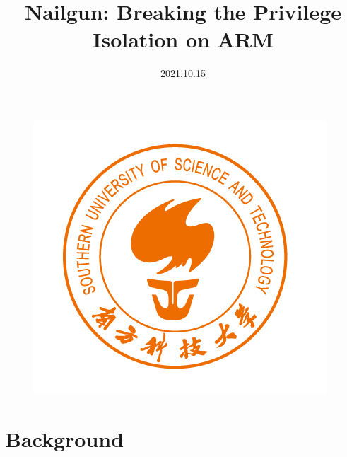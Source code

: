 \documentclass{beamer}
\title{Nailgun: Breaking the Privilege Isolation on ARM}
\date{2021.10.15}
\begin{document}
\kaishu
\begin{frame}
    \titlepage
    \begin{figure}[htbp]
        \begin{center}
            \includegraphics[scale = 0.16]{SUSTech-Beamer-Theme/pic/LOGO.png}
        \end{center}
    \end{figure}
\end{frame}

\begin{frame}
    \tableofcontents[sectionstyle=show,subsectionstyle=show/shaded/hide,subsubsectionstyle=show/shaded/hide]
\end{frame}

\section{Background}
\end{document}
